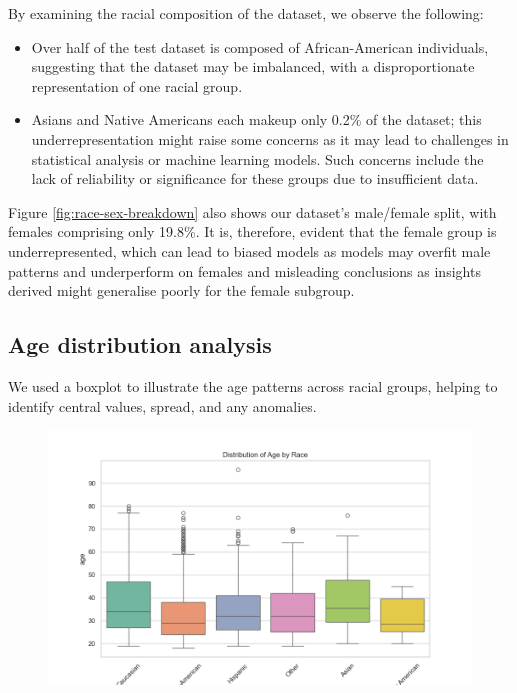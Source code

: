 \documentclass[conference]{IEEEtran}
\begin{document}
	
	By examining the racial composition of the dataset, we observe the following:
	
	\begin{itemize}
		\item Over half of the test dataset is composed of African-American individuals, suggesting that the dataset may be imbalanced, with a disproportionate representation of one racial group.
		\item Asians and Native Americans each makeup only 0.2\% of the dataset; this underrepresentation might raise some concerns as it may lead to challenges in statistical analysis or machine learning models. Such concerns include the lack of reliability or significance for these groups due to insufficient data.
	\end{itemize}
		
	Figure \ref{fig:race-sex-breakdown} also shows our dataset's male/female split, with females comprising only 19.8\%. It is, therefore, evident that the female group is underrepresented, which can lead to biased models as models may overfit male patterns and underperform on females and misleading conclusions as insights derived might generalise poorly for the female subgroup.
	
	
	\subsection{Age distribution analysis}
	

	We used a boxplot to illustrate the age patterns across racial groups, helping to identify central values, spread, and any anomalies.

	\begin{figure}[!ht]
		\centering
		\includegraphics[width=0.7\linewidth]{img/age_by_race_boxplot}
		\caption{}
		\label{fig:age-by-race-boxplot}
	\end{figure}
	
\end{document}
